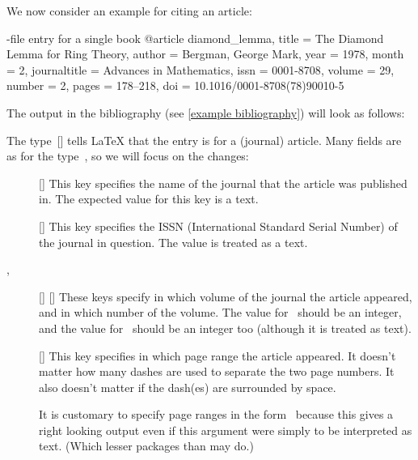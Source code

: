 We now consider an example for citing an article:

\begin{showcode}[label = {bib entry article}]{-file entry for a single book}
@article {diamond_lemma,
  title         = {The Diamond Lemma for Ring Theory},
  author        = {Bergman, George Mark},
  year          = {1978},
  month         = {2},
  journaltitle  = {Advances in Mathematics},
  issn          = {0001-8708},
  volume        = {29},
  number        = {2},
  pages         = {178--218},
  doi           = {10.1016/0001-8708(78)90010-5}
}
\end{showcode}
The output in the bibliography (see \cref{example bibliography}) will look as follows:

The type~[\atname] tells {\LaTeX} that the entry is for a (journal) article.
Many fields are as for the type~, so we will focus on the changes:
\begin{description}
  \item[]
    [\optname]
    This key specifies the name of the journal that the article was published in.
    The expected value for this key is a text.
  \item[]
    [\optname]
    This key specifies the ISSN (International Standard Serial Number) of the journal in question.
    The value is treated as a text.
  \item[, ]
    [\optname]
    [\optname]
    These keys specify in which volume of the journal the article appeared, and in which number of the volume.
    The value for~ should be an integer, and the value for~ should be an integer too (although it is treated as text).
  \item[]
    [\optname]
    This key specifies in which page range the article appeared.
    It doesn’t matter how many dashes are used to separate the two page numbers.
    It also doesn’t matter if the dash(es) are surrounded by space.
    
    It is customary to specify page ranges in the form~ because this gives a right looking output even if this argument were simply to be interpreted as text.
    (Which lesser packages than  may do.)
\end{description}

